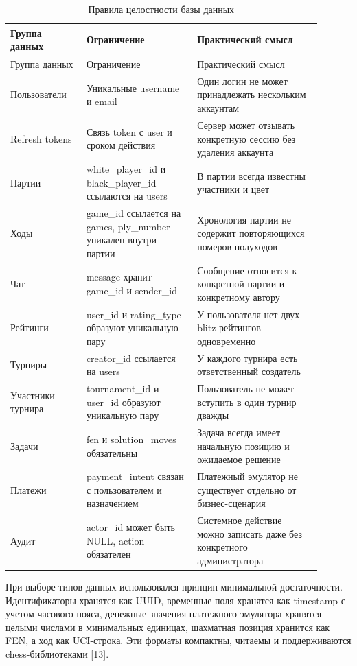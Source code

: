 \noindent\scriptsize
\setlength{\tabcolsep}{3pt}
\renewcommand{\arraystretch}{1.16}
\begin{longtable}{|>{\RaggedRight\arraybackslash}p{0.22\linewidth}|>{\RaggedRight\arraybackslash}p{0.32\linewidth}|>{\RaggedRight\arraybackslash}p{0.36\linewidth}|}
\caption{Правила целостности базы данных}\label{tab:db-integrity}\\
\hline
Группа данных & Ограничение & Практический смысл\\ \hline
\endfirsthead
\hline
Группа данных & Ограничение & Практический смысл\\ \hline
\endhead
Пользователи & Уникальные username и email & Один логин не может принадлежать нескольким аккаунтам\\ \hline
Refresh tokens & Связь token с user и сроком действия & Сервер может отзывать конкретную сессию без удаления аккаунта\\ \hline
Партии & white_player_id и black_player_id ссылаются на users & В партии всегда известны участники и цвет\\ \hline
Ходы & game_id ссылается на games, ply_number уникален внутри партии & Хронология партии не содержит повторяющихся номеров полуходов\\ \hline
Чат & message хранит game_id и sender_id & Сообщение относится к конкретной партии и конкретному автору\\ \hline
Рейтинги & user_id и rating_type образуют уникальную пару & У пользователя нет двух blitz-рейтингов одновременно\\ \hline
Турниры & creator_id ссылается на users & У каждого турнира есть ответственный создатель\\ \hline
Участники турнира & tournament_id и user_id образуют уникальную пару & Пользователь не может вступить в один турнир дважды\\ \hline
Задачи & fen и solution_moves обязательны & Задача всегда имеет начальную позицию и ожидаемое решение\\ \hline
Платежи & payment_intent связан с пользователем и назначением & Платежный эмулятор не существует отдельно от бизнес-сценария\\ \hline
Аудит & actor_id может быть NULL, action обязателен & Системное действие можно записать даже без конкретного администратора\\ \hline
\end{longtable}
\normalsize

При выборе типов данных использовался принцип минимальной достаточности. Идентификаторы хранятся как UUID, временные поля хранятся как timestamp с учетом часового пояса, денежные значения платежного эмулятора хранятся целыми числами в минимальных единицах, шахматная позиция хранится как FEN, а ход как UCI-строка. Эти форматы компактны, читаемы и поддерживаются chess-библиотеками [13].

